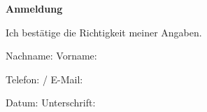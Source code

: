 \documentclass[a4paper,12pt]{scrartcl}
\begin{document}
\centerline{\textbf{\LARGE Anmeldung}}

 Ich bestätige die Richtigkeit meiner Angaben.

Nachname: \dotfill\quad Vorname: \dotfill

 Telefon: \hrulefill /\hrulefill\hrulefill\quad 
{} E-Mail: \hrulefill\hrulefill\hrulefill

Datum: \dotfill\quad Unterschrift: \dotfill
\end{document}
